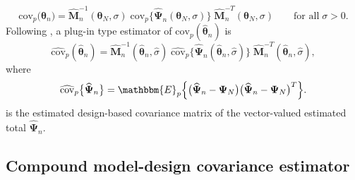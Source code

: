 \documentclass[a4paper,oneside,11pt,DIV=12]{scrartcl}
\theoremstyle{remark}
\begin{document}
\begin{equation}\label{eq:reg_plim}
    \mathrm{cov}_{p} \big( \widehat{\bm \theta}_n \big) = \widehat{\bm M}_n^{-1}(\bm \theta_N, \sigma) \; \mathrm{cov}_p\Big\{\widehat{\bm \Psi}_n(\bm \theta_N, \sigma) \Big\} \; \widehat{\bm M}_n^{-T}(\bm \theta_N, \sigma) \qquad \text{for all} \; \sigma > 0.
\end{equation}
Following \citet{binder_1983}, a plug-in type estimator of $\mathrm{cov}_p(\widehat{\bm \theta}_n)$ is
\begin{equation}
    \widehat{\mathrm{cov}}_p(\widehat{\bm \theta}_n) = \widehat{\bm M}_n^{-1}(\widehat{\bm \theta}_n, \widehat{\sigma}) \; \widehat{\mathrm{cov}}_p \Big\{ \widehat{\bm \Psi}_n(\widehat{\bm \theta}_n, \widehat{\sigma}) \Big\} \; \widehat{\bm M}_n^{-T}(\widehat{\bm \theta}_n, \widehat{\sigma}),
\end{equation}
\noindent where
\begin{equation*}
    \widehat{\mathrm{cov}}_p \big\{ \widehat{\bm \Psi}_n\big\} = \mathbbm{E}_p \Big\{ \big(\widehat{\bm \Psi}_n - \bm \Psi_N\big) \big(\widehat{\bm \Psi}_n - \bm \Psi_N\big)^T\Big\}.
\end{equation*}
\noindent is the estimated design-based covariance matrix of the vector-valued estimated total $\widehat{\bm \Psi}_n$.

\subsection{Compound model-design covariance estimator}
\end{document}
